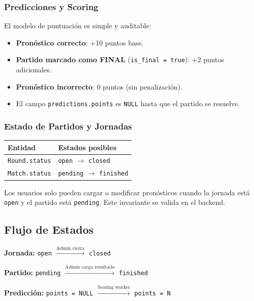 \documentclass[12pt,a4paper]{article}
\newcommand{\code}[1]{\texttt{\small\color{navy}#1}}
\begin{document}
\subsubsection{Predicciones y Scoring}

El modelo de puntuación es simple y auditable:

\begin{infobox}
\begin{itemize}
  \item \textbf{Pronóstico correcto}: +10 puntos base.
  \item \textbf{Partido marcado como FINAL} (\code{is\_final = true}): +2 puntos adicionales.
  \item \textbf{Pronóstico incorrecto}: 0 puntos (sin penalización).
  \item El campo \code{predictions.points} es \code{NULL} hasta que el partido se resuelve.
\end{itemize}
\end{infobox}

\subsubsection{Estado de Partidos y Jornadas}

\begin{center}
\begin{tabular}{@{}ll@{}}
  \toprule
  \textbf{Entidad} & \textbf{Estados posibles} \\
  \midrule
  \code{Round.status}  & \code{open} $\to$ \code{closed} \\
  \code{Match.status}  & \code{pending} $\to$ \code{finished} \\
  \bottomrule
\end{tabular}
\end{center}

Los usuarios solo pueden cargar o modificar pronósticos cuando la jornada está \code{open}
y el partido está \code{pending}. Este invariante se valida en el backend.

\subsection{Flujo de Estados}

\begin{center}
\small
\textbf{Jornada:} \texttt{open} $\xrightarrow{\text{Admin cierra}}$ \texttt{closed}

\vspace{0.3cm}

\textbf{Partido:} \texttt{pending} $\xrightarrow{\text{Admin carga resultado}}$ \texttt{finished}

\vspace{0.3cm}

\textbf{Predicción:} \texttt{points = NULL} $\xrightarrow{\text{Scoring worker}}$ \texttt{points = N}
\end{center}
\end{document}
